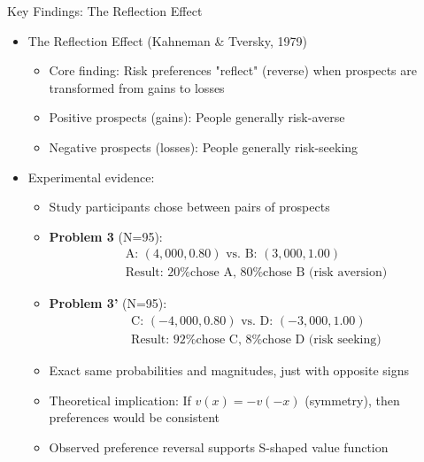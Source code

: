 \documentclass[10pt,handout]{beamer}
\begin{document}
\begin{frame}{Key Findings: The Reflection Effect}
  \begin{itemize}[<+->]
    \item The Reflection Effect (Kahneman \& Tversky, 1979)
      \begin{itemize}
        \item Core finding: Risk preferences "reflect" (reverse) when prospects are transformed from gains to losses
        \item Positive prospects (gains): People generally risk-averse
        \item Negative prospects (losses): People generally risk-seeking
      \end{itemize}
    \item Experimental evidence:
      \begin{itemize}
        \item Study participants chose between pairs of prospects
        \item \textbf{Problem 3} (N=95):
          \begin{align*}
            &\text{A: } (4,000, 0.80) \text{ vs. B: } (3,000, 1.00)\\
            &\text{Result: 20\% chose A, 80\% chose B (risk aversion)}
          \end{align*}
        \item \textbf{Problem 3'} (N=95):
          \begin{align*}
            &\text{C: } (-4,000, 0.80) \text{ vs. D: } (-3,000, 1.00)\\
            &\text{Result: 92\% chose C, 8\% chose D (risk seeking)}
          \end{align*}
        \item Exact same probabilities and magnitudes, just with opposite signs
        \item Theoretical implication: If $v(x) = -v(-x)$ (symmetry), then preferences would be consistent
        \item Observed preference reversal supports S-shaped value function
      \end{itemize}
  \end{itemize}
\end{frame}
\end{document}
